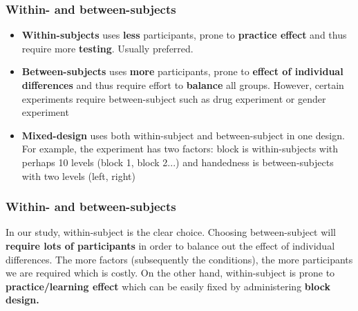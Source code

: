 \documentclass{beamer}
\begin{document}
\begin{frame}
\frametitle{Within- and between-subjects}
\begin{itemize}
\item \textbf{Within-subjects} uses \textbf{less} participants, prone to \textbf{practice effect} and thus require more \textbf{testing}.  Usually preferred.
\item \textbf{Between-subjects} uses \textbf{more} participants, prone to \textbf{effect of individual differences} and thus require effort to \textbf{balance} all groups.  However, certain experiments require between-subject such as drug experiment or gender experiment  
\item \textbf{Mixed-design} uses both within-subject and between-subject in one design.  For example, the experiment has two factors: block is within-subjects with perhaps 10 levels (block 1, block 2...) and handedness is between-subjects with two levels (left, right)
\end{itemize}
\end{frame}

\begin{frame}
\frametitle{Within- and between-subjects}
In our study, within-subject is the clear choice.   Choosing between-subject will 	\textbf{require lots of participants} in order to balance out the effect of individual differences.  The more factors (subsequently the conditions), the more participants we are required which is costly.  On the other hand, within-subject is prone to \textbf{practice/learning effect} which can be easily fixed by administering \textbf{block design.}
\end{frame}

\end{document}
